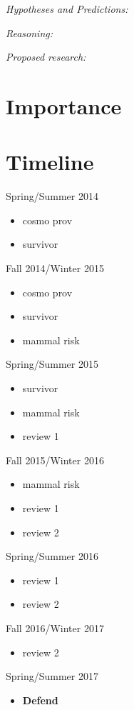 \documentclass[12pt,letterpaper]{article}
\begin{document}
\textit{Hypotheses and Predictions:}

\textit{Reasoning:}

\textit{Proposed research:}


\section{Importance}

\clearpage
\section{Timeline}

Spring/Summer 2014
\begin{itemize}
  \item cosmo prov
  \item survivor
\end{itemize}

Fall 2014/Winter 2015
\begin{itemize}
  \item cosmo prov
  \item survivor
  \item mammal risk
\end{itemize}

Spring/Summer 2015
\begin{itemize}
  \item survivor
  \item mammal risk
  \item review 1
\end{itemize}

Fall 2015/Winter 2016
\begin{itemize}
  \item mammal risk
  \item review 1
  \item review 2
\end{itemize}

Spring/Summer 2016
\begin{itemize}
  \item review 1
  \item review 2
\end{itemize}

Fall 2016/Winter 2017
\begin{itemize}
  \item review 2
\end{itemize}

Spring/Summer 2017
\begin{itemize}
  \item \textbf{Defend}
\end{itemize}



\clearpage


\end{document}
